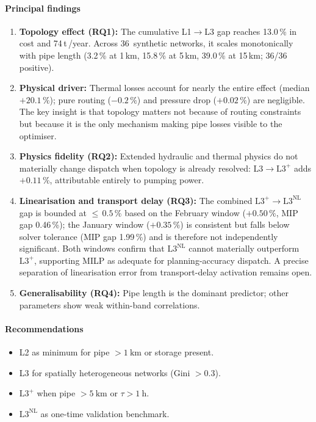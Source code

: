 \documentclass[a4paper,fleqn]{cas-dc}
\newcommand{\Lplus}{\mathrm{L3}^{+}}
\newcommand{\Lnl}{\mathrm{L3}^{\mathrm{NL}}}
\begin{document}
\paragraph{Principal findings}
\begin{enumerate}[nosep]
  \item \textbf{Topology effect (RQ1):} The cumulative L1$\to$L3
        gap reaches 13.0\,\% in cost and 74\,t\,/year.
        Across 36~synthetic networks, it scales monotonically
        with pipe length (3.2\,\% at 1\,km, 15.8\,\% at 5\,km,
        39.0\,\% at 15\,km; 36/36 positive).
  \item \textbf{Physical driver:} Thermal losses account for
        nearly the entire effect (median $+20.1\,\%$); pure
        routing ($-0.2\,\%$) and pressure drop ($+0.02\,\%$)
        are negligible. The key insight is that topology matters
        not because of routing constraints but because it is the
        only mechanism making pipe losses visible to the optimiser.
  \item \textbf{Physics fidelity (RQ2):}
        Extended hydraulic and thermal physics do not materially
        change dispatch when topology is already resolved:
        L3$\to\Lplus$ adds $+0.11\,\%$, attributable entirely
        to pumping power.
   \item \textbf{Linearisation and transport delay (RQ3):}
        The combined $\Lplus\to\Lnl$ gap is bounded at
        ${\leq}\,0.5\,\%$ based on the February window
        ($+0.50\,\%$, MIP gap 0.46\,\%); the January window
        ($+0.35\,\%$) is consistent but falls below solver
        tolerance (MIP gap 1.99\,\%) and is therefore not
        independently significant. Both windows confirm that
        $\Lnl$ cannot materially outperform $\Lplus$, supporting
        MILP as adequate for planning-accuracy dispatch. A precise
        separation of linearisation error from transport-delay
        activation remains open.
  \item \textbf{Generalisability (RQ4):} Pipe length is the
        dominant predictor; other parameters show weak
        within-band correlations.
\end{enumerate}

\paragraph{Recommendations}
\begin{itemize}[nosep]
  \item L2 as minimum for pipe ${>}\SI{1}{\kilo\metre}$ or
        storage present.
  \item L3 for spatially heterogeneous networks (Gini ${>}0.3$).
  \item $\Lplus$ when pipe ${>}\SI{5}{\kilo\metre}$ or
        $\tau > \SI{1}{\hour}$.
  \item $\Lnl$ as one-time validation benchmark.
\end{itemize}
\end{document}
